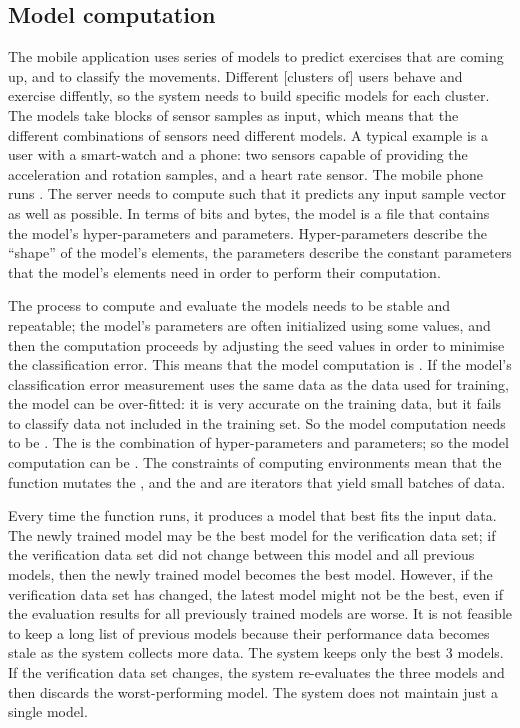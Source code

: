 \subsection{Model computation}\label{sec:model-computation}
The mobile application uses series of models to predict exercises that are coming up, and to classify the movements. Different [clusters of] users behave and exercise diffently, so the system needs to build specific models for each cluster. The models take blocks of sensor samples as input, which means that the different combinations of sensors need different models. A typical example is a user with a smart-watch and a phone: two sensors capable of providing the acceleration and rotation samples, and a heart rate sensor. The mobile phone runs . The server needs to compute  such that it predicts any input sample vector as well as possible. In terms of bits and bytes, the model is a file that contains the model's hyper-parameters and parameters. Hyper-parameters describe the ``shape'' of the model's elements, the parameters describe the constant parameters that the model's elements need in order to perform their computation.

The process to compute and evaluate the models needs to be stable and repeatable; the model's parameters are often initialized using some  values, and then the computation proceeds by adjusting the seed values in order to minimise the classification error. This means that the model computation is . If the model's classification error measurement uses the same data as the data used for training, the model can be over-fitted: it is very accurate on the training data, but it fails to classify data not included in the training set. So the model computation needs to be . The  is the combination of hyper-parameters and parameters; so the model computation can be . The constraints of computing environments mean that the  function mutates the , and the  and  are iterators that yield small batches of data.

Every time the  function runs, it produces a model that best fits the input data. The newly trained model may be the best model for the verification data set; if the verification data set did not change between this model and all previous models, then the newly trained model becomes the best model. However, if the verification data set has changed, the latest model might not be the best, even if the evaluation results for all previously trained models are worse. It is not feasible to keep a long list of previous models because their performance data becomes stale as the system collects more data. The system keeps only the best 3 models. If the verification data set changes, the system re-evaluates the three models and then discards the worst-performing model. The system does not maintain just a single model.

